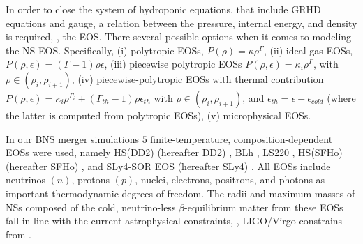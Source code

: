 In order to close the system of hydroponic equations, that include \ac{GRHD} 
equations and gauge, a relation between the pressure, 
internal energy, and density is required, \ie, the \ac{EOS}. 
%
There several possible options when it comes to modeling the \ac{NS} \ac{EOS}. 
Specifically, 
(i) polytropic \acp{EOS}, $P(\rho)=\kappa\rho^{\Gamma}$, 
(ii) ideal gas \acp{EOS}, $P(\rho,\epsilon)=(\Gamma-1)\rho\epsilon$, 
(iii) piecewise polytropic \acp{EOS} $P(\rho,\epsilon) = \kappa_i\rho^{\Gamma}$, 
with $\rho\in(\rho_i,\rho_{i+1})$, 
(iv) piecewise-polytropic \acp{EOS} with thermal contribution 
$P(\rho,\epsilon)=\kappa_i\rho^{\Gamma_i} + (\Gamma_{th}-1)\rho\epsilon_{th}$ 
with $\rho\in(\rho_i,\rho_{i+1})$, and $\epsilon_{th}=\epsilon-\epsilon_{cold}$ 
(where the latter is computed from polytropic \acp{EOS}), 
(v) microphysical \acp{EOS}.


In our \ac{BNS} merger simulations $5$ finite-temperature, composition-dependent \acp{EOS} were used, 
namely 
HS(DD2) (hereafter DD2) \citep{Typel:2009sy,Hempel:2009mc}, 
BLh \citep{Bombaci:2018ksa,Logoteta:2020yxf}, 
LS220 \citep{Lattimer:1991nc}, 
HS(SFHo) (hereafter SFHo) \citep{Steiner:2012rk}, and 
SLy4-SOR EOS (hereafter SLy4) \citep{daSilvaSchneider:2017jpg}.
%
All \acp{EOS} include neutrinos $(n)$, protons $(p)$, nuclei, electrons, positrons, and photons
as important thermodynamic degrees of freedom.
%
The radii and maximum masses of \acp{NS} composed of the cold, neutrino-less 
$\beta$-equilibrium matter from these \acp{EOS} fall in line with the current 
astrophysical constraints, \eg, LIGO/Virgo constrains from \GW{} 
\citep{TheLIGOScientific:2017qsa,Abbott:2018wiz,De:2018uhw,Abbott:2018exr}. 
%



